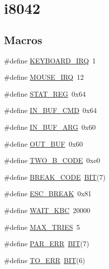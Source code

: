 \hypertarget{group__i8042}{}\section{i8042}
\label{group__i8042}
\subsection*{Macros}
\begin{DoxyCompactItemize}
\item 
\#define \mbox{\hyperlink{group__i8042_ga2d17911b50c0aeebb2e3325c5b36d4f2}{K\+E\+Y\+B\+O\+A\+R\+D\+\_\+\+I\+RQ}}~1
\item 
\#define \mbox{\hyperlink{group__i8042_ga85964cb90343bb1a029b1d1b4229f910}{M\+O\+U\+S\+E\+\_\+\+I\+RQ}}~12
\item 
\#define \mbox{\hyperlink{group__i8042_ga89c4d098b53809674457b1660b1af780}{S\+T\+A\+T\+\_\+\+R\+EG}}~0x64
\item 
\#define \mbox{\hyperlink{group__i8042_ga87da1954d01adc893f21e25bdfd48630}{I\+N\+\_\+\+B\+U\+F\+\_\+\+C\+MD}}~0x64
\item 
\#define \mbox{\hyperlink{group__i8042_ga67a4b3af0329557ddaf60c0ee0c4d906}{I\+N\+\_\+\+B\+U\+F\+\_\+\+A\+RG}}~0x60
\item 
\#define \mbox{\hyperlink{group__i8042_gacfb42dde389e8ca36ab267002fbf5c6a}{O\+U\+T\+\_\+\+B\+UF}}~0x60
\item 
\#define \mbox{\hyperlink{group__i8042_gac954b7c022e8d5b3d04300259313051e}{T\+W\+O\+\_\+\+B\+\_\+\+C\+O\+DE}}~0xe0
\item 
\#define \mbox{\hyperlink{group__i8042_gac6b47609a951e77244ef2be1691c298a}{B\+R\+E\+A\+K\+\_\+\+C\+O\+DE}}~\mbox{\hyperlink{group__vbe_ga3a8ea58898cb58fc96013383d39f482c}{B\+IT}}(7)
\item 
\#define \mbox{\hyperlink{group__i8042_ga343f44cb034d2d2ff3438b3d45dcde1f}{E\+S\+C\+\_\+\+B\+R\+E\+AK}}~0x81
\item 
\#define \mbox{\hyperlink{group__i8042_gaa554763d6a066605edecacdea834da9b}{W\+A\+I\+T\+\_\+\+K\+BC}}~20000
\item 
\#define \mbox{\hyperlink{group__i8042_gafd63d23830ad86d01b6fff2e6c615f7e}{M\+A\+X\+\_\+\+T\+R\+I\+ES}}~5
\item 
\#define \mbox{\hyperlink{group__i8042_ga307ab71673e26ec42b28a3bca05d4cb5}{P\+A\+R\+\_\+\+E\+RR}}~\mbox{\hyperlink{group__vbe_ga3a8ea58898cb58fc96013383d39f482c}{B\+IT}}(7)
\item 
\#define \mbox{\hyperlink{group__i8042_gad16f61e2bf70f6c7685e826224ed177f}{T\+O\+\_\+\+E\+RR}}~\mbox{\hyperlink{group__vbe_ga3a8ea58898cb58fc96013383d39f482c}{B\+IT}}(6)

\end{DoxyCompactItemize}
